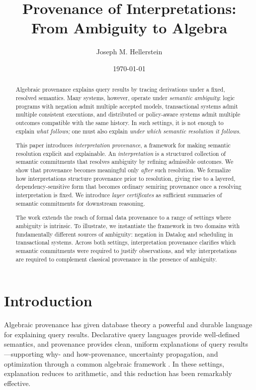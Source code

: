 \documentclass[acmsmall,nonacm]{acmart}
\title{Provenance of Interpretations: From Ambiguity to Algebra}
\author{Joseph M. Hellerstein}
\affiliation{%
  \institution{University of California, Berkeley and Amazon Web Services}
  \country{USA}
}
\date{\today}
\theoremstyle{remark}
\numberwithin{definition}{section}
\numberwithin{theorem}{section}
\numberwithin{lemma}{section}
\numberwithin{corollary}{section}
\numberwithin{remark}{section}
\numberwithin{example}{section}
\numberwithin{observation}{section}
\numberwithin{assumption}{section}
\begin{document}
\begin{abstract}
Algebraic provenance explains query results by tracing derivations under a fixed,
resolved semantics.
Many systems, however, operate under \emph{semantic ambiguity}:
logic programs with negation admit multiple accepted models, transactional
systems admit multiple consistent executions, and distributed or policy-aware
systems admit multiple outcomes compatible with the same history.
In such settings, it is not enough to explain \emph{what follows;} one must also
explain \emph{under which semantic resolution it follows}.

This paper introduces \emph{interpretation provenance}, a framework for making
semantic resolution explicit and explainable.
An \emph{interpretation} is a structured collection of semantic commitments that
resolves ambiguity by refining admissible outcomes.
We show that provenance becomes meaningful only \emph{after} such resolution.
We formalize how interpretations structure provenance prior to resolution, giving
rise to a layered, dependency-sensitive form that becomes ordinary semiring
provenance once a resolving interpretation is fixed.
We introduce \emph{layer certificates} as sufficient summaries of semantic
commitments for downstream reasoning.

The work extends the reach of formal data provenance to a range of 
settings where ambiguity is intrinsic.
To illustrate, we instantiate the framework in two domains with fundamentally different sources
of ambiguity: negation in Datalog and scheduling in transactional systems.
Across both settings, interpretation provenance clarifies which semantic
commitments were required to justify observations, and why interpretations
are required to complement classical provenance in the presence of ambiguity.
\end{abstract}

\maketitle

\section{Introduction}
\label{sec:intro}

Algebraic provenance has given database theory a powerful and durable language for
explaining query results.
Declarative query languages provide well-defined semantics,
and provenance provides clean, uniform explanations of query
results—supporting why- and how-provenance, uncertainty propagation,
and optimization through a common algebraic framework
\cite{green2007provenance,suciu2011probabilistic}.
In these settings, explanation reduces to arithmetic, and this reduction has been
remarkably effective.
\end{document}
